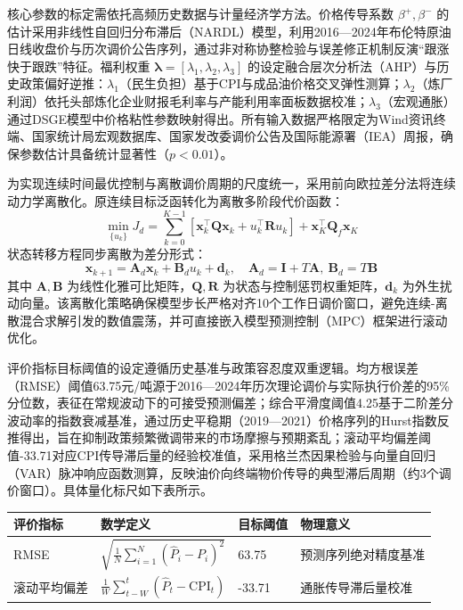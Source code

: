 \documentclass{mcmthesis}
\begin{document}
核心参数的标定需依托高频历史数据与计量经济学方法。价格传导系数 $\beta^+, \beta^-$ 的估计采用非线性自回归分布滞后（NARDL）模型，利用2016—2024年布伦特原油日线收盘价与历次调价公告序列，通过非对称协整检验与误差修正机制反演“跟涨快于跟跌”特征。福利权重 $\boldsymbol{\lambda} = [\lambda_1, \lambda_2, \lambda_3]$ 的设定融合层次分析法（AHP）与历史政策偏好逆推：$\lambda_1$（民生负担）基于CPI与成品油价格交叉弹性测算；$\lambda_2$（炼厂利润）依托头部炼化企业财报毛利率与产能利用率面板数据校准；$\lambda_3$（宏观通胀）通过DSGE模型中价格粘性参数映射得出。所有输入数据严格限定为Wind资讯终端、国家统计局宏观数据库、国家发改委调价公告及国际能源署（IEA）周报，确保参数估计具备统计显著性（$p<0.01$）。

为实现连续时间最优控制与离散调价周期的尺度统一，采用前向欧拉差分法将连续动力学离散化。原连续目标泛函转化为离散多阶段代价函数：
$$\min_{\{u_k\}} J_d = \sum_{k=0}^{K-1} \left[ \boldsymbol{x}_k^\top \boldsymbol{Q} \boldsymbol{x}_k + u_k^\top \boldsymbol{R} u_k \right] + \boldsymbol{x}_K^\top \boldsymbol{Q}_f \boldsymbol{x}_K \tag{3}$$
状态转移方程同步离散为差分形式：
$$\boldsymbol{x}_{k+1} = \boldsymbol{A}_d \boldsymbol{x}_k + \boldsymbol{B}_d u_k + \boldsymbol{d}_k, \quad \boldsymbol{A}_d = \boldsymbol{I} + T \boldsymbol{A}, \ \boldsymbol{B}_d = T \boldsymbol{B} \tag{4}$$
其中 $\boldsymbol{A}, \boldsymbol{B}$ 为线性化雅可比矩阵，$\boldsymbol{Q}, \boldsymbol{R}$ 为状态与控制惩罚权重矩阵，$\boldsymbol{d}_k$ 为外生扰动向量。该离散化策略确保模型步长严格对齐10个工作日调价窗口，避免连续-离散混合求解引发的数值震荡，并可直接嵌入模型预测控制（MPC）框架进行滚动优化。

评价指标目标阈值的设定遵循历史基准与政策容忍度双重逻辑。均方根误差（RMSE）阈值63.75元/吨源于2016—2024年历次理论调价与实际执行价差的95\%分位数，表征在常规波动下的可接受预测偏差；综合平滑度阈值4.25基于二阶差分波动率的指数衰减基准，通过历史平稳期（2019—2021）价格序列的Hurst指数反推得出，旨在抑制政策频繁微调带来的市场摩擦与预期紊乱；滚动平均偏差阈值-33.71对应CPI传导滞后量的经验校准值，采用格兰杰因果检验与向量自回归（VAR）脉冲响应函数测算，反映油价向终端物价传导的典型滞后周期（约3个调价窗口）。具体量化标尺如下表所示。

\begin{table}[htbp]
\centering
\begin{tabular}{l l l l}
\toprule
评价指标 & 数学定义 & 目标阈值 & 物理意义 \\
\midrule
RMSE & $\sqrt{\frac{1}{N}\sum_{i=1}^{N}(\hat{P}_i-P_i)^2}$ & 63.75 & 预测序列绝对精度基准 \\
滚动平均偏差 & $\frac{1}{W}\sum_{t-W}^{t}(\hat{P}_t-\text{CPI}_t)$ & -33.71 & 通胀传导滞后量校准 \\
\bottomrule
\end{tabular}
\end{table}
\end{document}
